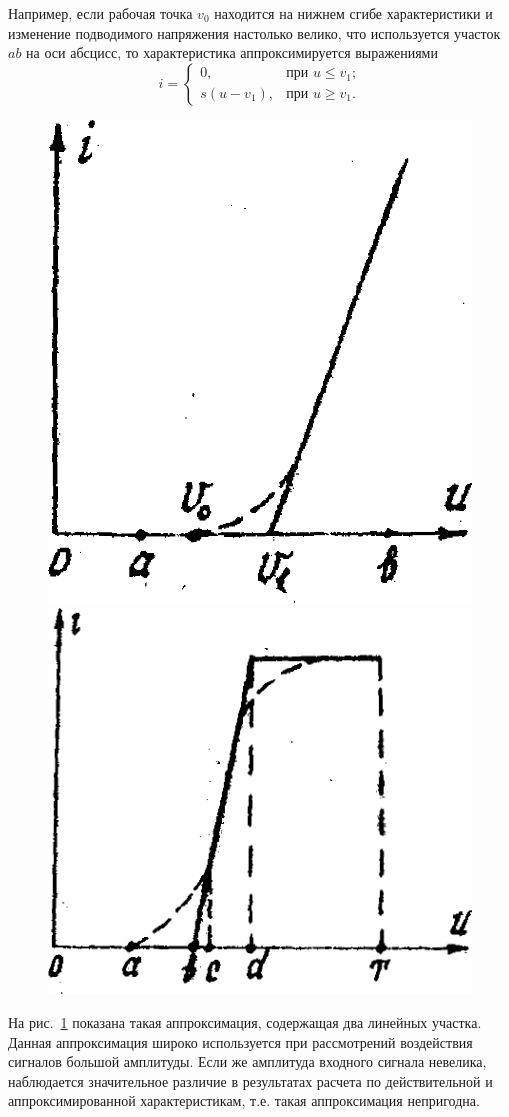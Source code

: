 Например, если рабочая точка $v_0$ находится на нижнем сгибе характеристики и изменение подводимого напряжения настолько велико, что используется участок $ab$ на оси абсцисс, то характеристика аппроксимируется выражениями
\begin{equation*}
i = \begin{cases} 
0, & \text{при $u\leq v_1$;} \\ 
s(u-v_1), & \text{при $u\geq v_1$.} 
\end{cases}
\end{equation*}
\begin{figure}[h!]
	\begin{minipage}{0.49\linewidth}
		\centering
		\includegraphics[width=0.5\linewidth]{picture/pic21}
	\end{minipage}
	\begin{minipage}{0.49\linewidth}
		\centering
		\includegraphics[width=0.6\linewidth]{picture/pic22}
	\end{minipage}
\caption{}
\label{pic:2}
\end{figure}
На рис.~\ref{pic:2} показана такая аппроксимация, содержащая два линейных участка. Данная аппроксимация широко используется при рассмотрений воздействия сигналов большой амплитуды. Если же амплитуда входного сигнала невелика, наблюдается значительное различие в результатах расчета по действительной и аппроксимированной характеристикам, т.е. такая аппроксимация непригодна.
